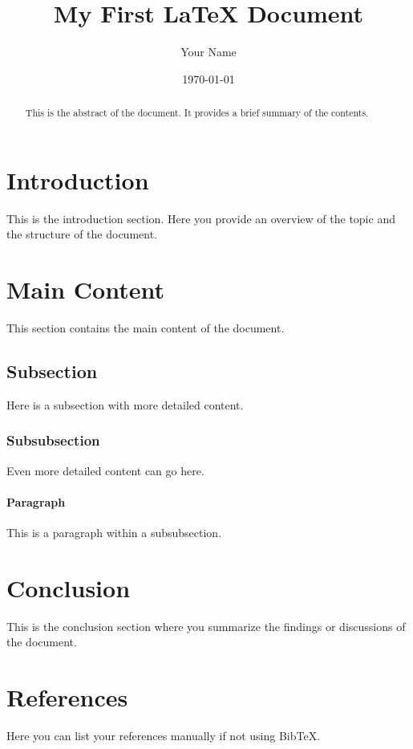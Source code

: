 \documentclass[a4paper,12pt]{article}
\title{My First LaTeX Document}
\author{Your Name}
\date{\today}                 %
\begin{document}
\maketitle

\begin{abstract}
This is the abstract of the document. It provides a brief summary of the contents.
\end{abstract}

\section{Introduction}
This is the introduction section. Here you provide an overview of the topic and the structure of the document.

\section{Main Content}
This section contains the main content of the document.

\subsection{Subsection}
Here is a subsection with more detailed content.

\subsubsection{Subsubsection}
Even more detailed content can go here.

\paragraph{Paragraph}
This is a paragraph within a subsubsection.

\section{Conclusion}
This is the conclusion section where you summarize the findings or discussions of the document.

\section*{References}
% 
% 

Here you can list your references manually if not using BibTeX.
\end{document}
